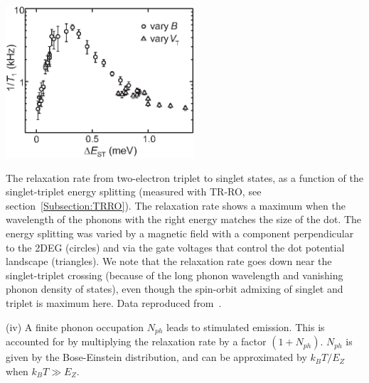 \documentclass[12pt,aps,nofootinbib]{revtex4-1}
\begin{document}
\bfig
\includegraphics[width=7cm]{hanson_fig21.eps}
\caption{The relaxation rate from two-electron triplet to singlet states, as a function of the singlet-triplet energy splitting (measured with TR-RO, see section~\ref{Subsection:TRRO}). The relaxation rate shows a maximum when the wavelength of the phonons with the right energy matches the size of the dot. The energy splitting was varied by a magnetic field with a component perpendicular to the 2DEG (circles) and via the gate voltages that control the dot potential landscape (triangles). We note that the relaxation rate goes down near the singlet-triplet crossing (because of the long phonon wavelength and vanishing phonon density of states), even though the spin-orbit admixing of singlet and triplet is maximum here. Data reproduced from~\textcite{meunier07}.} \label{fig:meunier_T1} \efig

(iv) A finite phonon occupation $N_{ph}$ leads to stimulated emission. This is accounted for by multiplying the relaxation rate by a factor $(1+N_{ph})$. $N_{ph}$ is given by the Bose-Einstein distribution, and can be approximated by $k_B T / E_Z$ when $k_B T \gg E_Z$.
\end{document}
